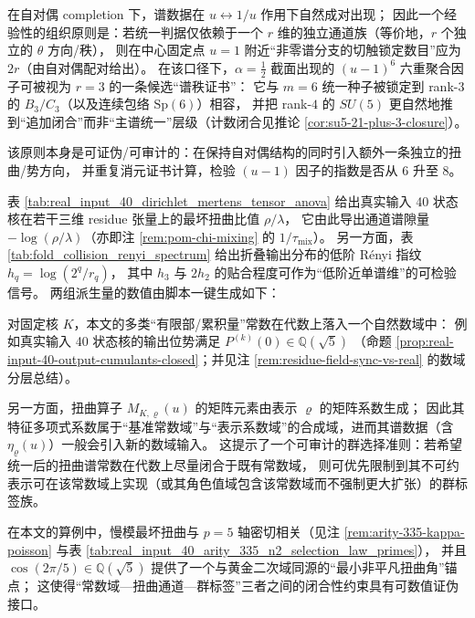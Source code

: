\begin{remark}\label{rem:u1-six-branch-rank3-certificate}
在自对偶 completion 下，谱数据在 \(u\leftrightarrow 1/u\) 作用下自然成对出现；
因此一个经验性的组织原则是：若统一判据仅依赖于一个 \(r\) 维的独立通道族（等价地，\(r\) 个独立的 \(\theta\) 方向/秩），
则在中心固定点 \(u=1\) 附近“非零谱分支的切触锁定数目”应为 \(2r\)（由自对偶配对给出）。
在该口径下，\(\alpha=\tfrac12\) 截面出现的 \((u-1)^6\) 六重聚合因子可被视为 \(r=3\) 的一条候选“谱秩证书”：
它与 \(m=6\) 统一种子被锁定到 rank-\(3\) 的 \(B_3/C_3\)（以及连续包络 \(\mathrm{Sp}(6)\)）相容，
并把 rank-\(4\) 的 \(SU(5)\) 更自然地推到“追加闭合”而非“主谱统一”层级（计数闭合见推论 \ref{cor:su5-21-plus-3-closure}）。
\par
该原则本身是可证伪/可审计的：在保持自对偶结构的同时引入额外一条独立的扭曲/势方向，
并重复消元证书计算，检验 \((u-1)\) 因子的指数是否从 \(6\) 升至 \(8\)。
\end{remark}

\begin{remark}\label{rem:spec-gap-numeric-anchors}
表 \ref{tab:real_input_40_dirichlet_mertens_tensor_anova} 给出真实输入 40 状态核在若干三维 residue 张量上的最坏扭曲比值 \(\rho/\lambda\)，
它由此导出通道谱隙量 \(-\log(\rho/\lambda)\)（亦即注 \ref{rem:pom-chi-mixing} 的 \(1/\tau_{\mathrm{mix}}\)）。
另一方面，表 \ref{tab:fold_collision_renyi_spectrum} 给出折叠输出分布的低阶 Rényi 指纹 \(h_q=\log(2^q/r_q)\)，
其中 \(h_3\) 与 \(2h_2\) 的贴合程度可作为“低阶近单谱维”的可检验信号。
两组派生量的数值由脚本一键生成如下：

\end{remark}

\begin{remark}\label{rem:character-field-matching}
对固定核 \(K\)，本文的多类“有限部/累积量”常数在代数上落入一个自然数域中：
例如真实输入 40 状态核的输出位势满足 \(P^{(k)}(0)\in\mathbb{Q}(\sqrt5)\)
（命题 \ref{prop:real-input-40-output-cumulants-closed}；并见注 \ref{rem:residue-field-sync-vs-real} 的数域分层总结）。
\par
另一方面，扭曲算子 \(M_{K,\varrho}(u)\) 的矩阵元素由表示 \(\varrho\) 的矩阵系数生成；
因此其特征多项式系数属于“基准常数域”与“表示系数域”的合成域，进而其谱数据（含 \(\eta_{\varrho}(u)\)）一般会引入新的数域输入。
这提示了一个可审计的群选择准则：若希望统一后的扭曲谱常数在代数上尽量闭合于既有常数域，
则可优先限制到其不可约表示可在该常数域上实现（或其角色值域包含该常数域而不强制更大扩张）的群标签族。
\par
在本文的算例中，慢模最坏扭曲与 \(p=5\) 轴密切相关（见注 \ref{rem:arity-335-kappa-poisson} 与表 \ref{tab:real_input_40_arity_335_n2_selection_law_primes}），
并且 \(\cos(2\pi/5)\in\mathbb{Q}(\sqrt5)\) 提供了一个与黄金二次域同源的“最小非平凡扭曲角”锚点；
这使得“常数域—扭曲通道—群标签”三者之间的闭合性约束具有可数值证伪接口。
\end{remark}


